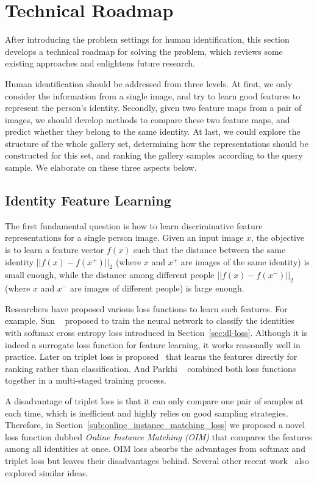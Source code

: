 \section{Technical Roadmap} %
\label{sec:human-id-tech-roadmap}
After introducing the problem settings for human identification, this section develops a technical roadmap for solving the problem, which reviews some existing approaches and enlightens future research.

Human identification should be addressed from three levels. At first, we only consider the information from a single image, and try to learn good features to represent the person's identity. Secondly, given two feature maps from a pair of images, we should develop methods to compare these two feature maps, and predict whether they belong to the same identity. At last, we could explore the structure of the whole gallery set, determining how the representations should be constructed for this set, and ranking the gallery samples according to the query sample. We elaborate on these three aspects below.

\subsection{Identity Feature Learning} %
\label{sub:human-id-feat-learn}
The first fundamental question is how to learn discriminative feature representations for a single person image. Given an input image $x$, the objective is to learn a feature vector $f(x)$ such that the distance between the same identity $||f(x)-f(x^+)||_2$ (where $x$ and $x^+$ are images of the same identity) is small enough, while the distance among different people $||f(x)-f(x^-)||_2$ (where $x$ and $x^-$ are images of different people) is large enough.

Researchers have proposed various loss functions to learn such features. For example, Sun \etal~\cite{sun2014deep1,sun2014deep2} proposed to train the neural network to classify the identities with softmax cross entropy loss introduced in Section~\ref{sec:dl-loss}. Although it is indeed a surrogate loss function for feature learning, it works reasonally well in practice. Later on triplet loss is proposed~\cite{taigman2014deepface} that learns the features directly for ranking rather than classification. And Parkhi \etal~\cite{parkhi2015deep} combined both loss functions together in a multi-staged training process.

A disadvantage of triplet loss is that it can only compare one pair of samples at each time, which is inefficient and highly relies on good sampling strategies. Therefore, in Section~\ref{sub:online_instance_matching_loss} we proposed a novel loss function dubbed \emph{Online Instance Matching (OIM)} that compares the features among all identities at once. OIM loss absorbs the advantages from softmax and triplet loss but leaves their disadvantages behind. Several other recent work~\cite{wen2016discriminative,titsias2016one,snell2017prototypical} also explored similar ideas.

